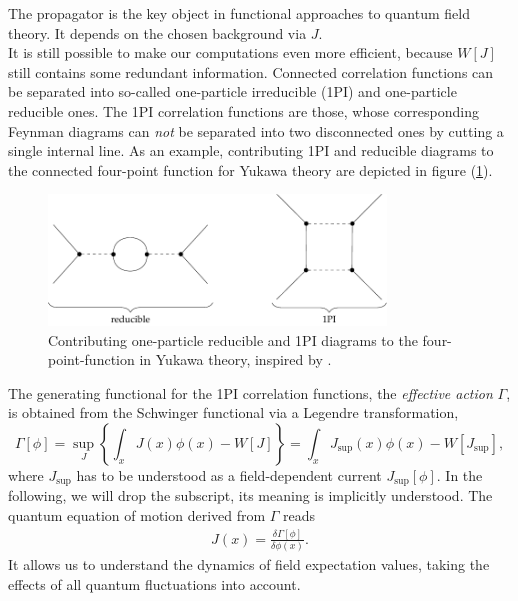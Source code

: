 The propagator is the key object in functional approaches to quantum field theory. It depends on the chosen background via $J$. \\
It is still possible to make our computations even more efficient, because $W[J]$ still contains some redundant information. Connected correlation functions can be separated into so-called one-particle irreducible (1PI) and one-particle reducible ones. The 1PI correlation functions are those, whose corresponding Feynman diagrams can \textit{not} be separated into two disconnected ones by cutting a single internal line. As an example, contributing 1PI and reducible diagrams to the connected four-point function for Yukawa theory are depicted in figure (\ref{fig:1PI_Yukawa}). \\
\begin{figure}[t]
\centering
\includegraphics[width=0.8\textwidth]{figs/TikZ/1PI_Yukawa}
\caption[Contributing one-particle reducible and 1PI diagrams to the four-point-function in Yukawa theory]{Contributing one-particle reducible and 1PI diagrams to the four-point-function in Yukawa theory, inspired by \cite{FloerchingerWetterichQFT}.}	
\label{fig:1PI_Yukawa}
\hrulefill
\end{figure}
The generating functional for the  1PI correlation functions, the \textit{effective action} $\Gamma$, is obtained from the Schwinger functional via a Legendre transformation, 
\begin{equation}
	\Gamma[\phi]=\sup _{J}\left\{\int_{x} J(x) \phi(x)-W[J]\right\}=\int_{x} J_{\mathrm{sup}}(x) \phi(x)-W\left[J_{\mathrm{sup}}\right],
\label{eqn:Def_Gamma}
\end{equation}
where $J_{\mathrm{sup}}$ has to be understood as a field-dependent current $J_{\mathrm{sup}}[\phi]$. In the following, we will drop the subscript, its meaning is implicitly understood. 
The quantum equation of motion derived from $\Gamma$ reads
\begin{align}
	J(x) = \frac{\delta\Gamma[\phi]}{\delta\phi(x)}.
	\label{eqn:quantum_eom}
\end{align}
It allows us to understand the dynamics of field expectation values, taking the effects of all quantum fluctuations into account.
